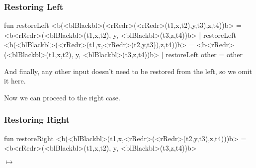 \documentclass[aspectratio=169, handout]{beamer}
\begin{document}
\begin{frame}[fragile]
  \frametitle{Restoring Left}

  \begin{codeblock}
    fun restoreLeft <b(<blBlackbl>(<rRedr>(<rRedr>(t1,x,t2),y,t3),z,t4))b> =
          <b<rRedr>(<blBlackbl>(t1,x,t2), y, <blBlackbl>(t3,z,t4))b>
      | restoreLeft <b(<blBlackbl>(<rRedr>(t1,x,<rRedr>(t2,y,t3)),z,t4))b> =
          <b<rRedr>(<blBlackbl>(t1,x,t2), y, <blBlackbl>(t3,z,t4))b>
      | restoreLeft other = other
  \end{codeblock}

  \pause
  \vspace{\fill}

  And finally, any other input doesn't need to be restored from the left,
  so we omit it here.

  \vspace{\fill}

  Now we can proceed to the right case.
\end{frame}

\begin{frame}[fragile]
  \frametitle{Restoring Right}

  \begin{codeblock}
    fun restoreRight <b(<blBlackbl>(t1,x,<rRedr>(<rRedr>(t2,y,t3),z,t4)))b> =
          <b<rRedr>(<blBlackbl>(t1,x,t2), y, <blBlackbl>(t3,z,t4))b>
  \end{codeblock}

  \pause
  \begin{center}
    \begin{minipage}{0.35\textwidth}
      \centering
    \end{minipage}
    \pause
    \begin{minipage}{0.1\textwidth}
      \centering
      \large$\longmapsto$
    \end{minipage}
    \begin{minipage}{0.35\textwidth}
      \centering
    \end{minipage}
  \end{center}
\end{frame}
\end{document}
